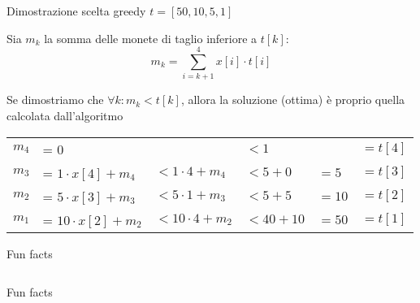 \begin{frame}{Dimostrazione scelta greedy $t = [50,10,5,1]$}

\vspace{-9pt}
\BIL
\item Sia $m_k$ la somma delle monete di taglio inferiore a $t[k]$:
\[
  m_k = \sum_{i=k+1}^4 x[i] \cdot  t[i]
\]

\item 
Se dimostriamo che $\forall k: m_k < t[k]$, allora la soluzione (ottima)
è proprio quella calcolata dall'algoritmo

\bigskip
\begin{tabular}{llllll}
$m_4$ &= $0$                   &              & $< 1$       &       & $= t[4]$ \\
$m_3$ &= $1 \cdot x[4] + m_4$  & $< 1 \cdot 4 + m_4$  & $< 5 + 0$   & $= 5$ & $= t[3]$ \\
$m_2$ &= $5 \cdot x[3] + m_3$  & $< 5 \cdot 1 + m_3$  & $< 5 + 5$   & $=10$ & $= t[2]$ \\
$m_1$ &= $10 \cdot x[2] + m_2$ & $< 10 \cdot 4 + m_2$ & $< 40 + 10$ & $=50$ & $= t[1]$ 
\end{tabular}
\EIL

\end{frame}

\begin{OnlySlides}{Fun facts}

\vspace{-18pt}
\begin{columns}[T]
\vspace{-3pt}
\begin{center}
\vspace{-3pt}
\end{center}
\end{columns}    
\smallskip
{}
\begin{center}
\end{center}

\end{OnlySlides}

\begin{OnlySlides}{Fun facts}
\vspace{-12pt}
\end{OnlySlides}


